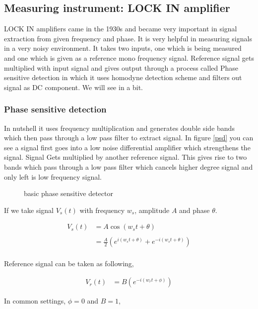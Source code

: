 \subsection{Measuring instrument: LOCK IN amplifier}

LOCK IN amplifiers came in the 1930s and became very important in signal extraction from given frequency and phase. It is very helpful in measuring signals in a very noisy environment. It takes two inputs, one which is being measured and one which is given as a reference mono frequency signal. Reference signal gets multiplied with input signal and gives output through a process called Phase sensitive detection in which it uses homodyne detection scheme and filters out signal as DC component. We will see in a bit.

\subsubsection{Phase sensitive detection}

In nutshell it uses frequency multiplication and generates double side bands which then pass through a low pass filter to extract signal. In figure \ref{psd} you can see a signal first goes into a low noise differential amplifier which strengthens the signal. Signal Gets multiplied by another reference signal. This gives rise to two bands which pass through a low pass filter which cancels higher degree signal and only left is low frequency signal.


\begin{figure}[hbt!]
\caption{basic phase sensitive detector}
\end{figure}

If we take signal $V_s(t)$ with frequency $w_s$, amplitude $A$ and phase $\theta$. 

\begin{align*}
V_{s}(t) & = A \cos(w_st+\theta)\\
\\
& = \frac{A}{2} (e^{i(w_st+\theta)}+e^{-i(w_st+\theta)})\\
\end{align*}

Reference signal can be taken as following,

\begin{align*}
V_r(t) & = B (e^{-i(w_rt+\phi)})
\end{align*}

In common settings, $\phi = 0$ and $B=1$,

